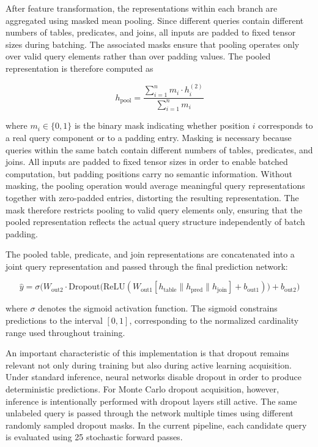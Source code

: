 After feature transformation, the representations within each branch are aggregated using masked mean pooling. Since different queries contain different numbers of tables, predicates, and joins, all inputs are padded to fixed tensor sizes during batching. The associated masks ensure that pooling operates only over valid query elements rather than over padding values. The pooled representation is therefore computed as

\begin{equation}
h_{\text{pool}} =
\frac{\sum_{i=1}^{n} m_i \cdot h_i^{(2)}}
{\sum_{i=1}^{n} m_i}
\end{equation}

where $m_i \in \{0,1\}$ is the binary mask indicating whether position $i$ corresponds to a real query component or to a padding entry. Masking is necessary because queries within the same batch contain different numbers of tables, predicates, and joins. All inputs are padded to fixed tensor sizes in order to enable batched computation, but padding positions carry no semantic information. Without masking, the pooling operation would average meaningful query representations together with zero-padded entries, distorting the resulting representation. The mask therefore restricts pooling to valid query elements only, ensuring that the pooled representation reflects the actual query structure independently of batch padding.

The pooled table, predicate, and join representations are concatenated into a joint query representation and passed through the final prediction network:

\begin{equation}
\hat{y} =
\sigma \Big(
W_{\text{out}2}
\cdot
\text{Dropout}
\big(
\text{ReLU}
(
W_{\text{out}1}
[
h_{\text{table}}
\parallel
h_{\text{pred}}
\parallel
h_{\text{join}}
]
+
b_{\text{out}1}
)
\big)
+
b_{\text{out}2}
\Big)
\end{equation}

where $\sigma$ denotes the sigmoid activation function. The sigmoid constrains predictions to the interval $[0,1]$, corresponding to the normalized cardinality range used throughout training.

An important characteristic of this implementation is that dropout remains relevant not only during training but also during active learning acquisition. Under standard inference, neural networks disable dropout in order to produce deterministic predictions. For Monte Carlo dropout acquisition, however, inference is intentionally performed with dropout layers still active. The same unlabeled query is passed through the network multiple times using different randomly sampled dropout masks. In the current pipeline, each candidate query is evaluated using 25 stochastic forward passes. 

